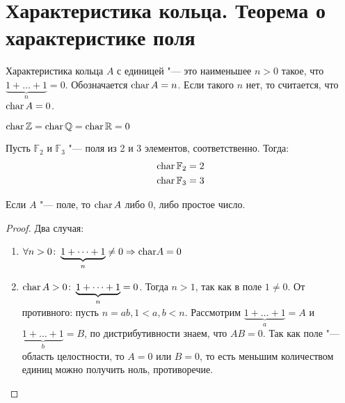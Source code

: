 \section{Характеристика кольца. Теорема о характеристике поля}
\begin{Def}
	Характеристика кольца $A$ с единицей "--- это наименьшее $n > 0$ такое, что $\underbrace{1+\dots+1}_{n} = 0$.
	Обозначается $\operatorname{char} A = n$.
	Если такого $n$ нет, то считается, что $\operatorname{char} A = 0$.
\end{Def}

\begin{exmp}
	$\operatorname{char} \mathbb{Z} = \operatorname{char} \mathbb{Q} = \operatorname{char} \mathbb{R} = 0$
\end{exmp}
\begin{exmp}
	Пусть $\mathbb{F}_2$ и $\mathbb{F}_3$ "--- поля из 2 и 3 элементов, соответственно. Тогда:
	\begin{gather*}
	\operatorname{char} \mathbb{F}_2 = 2 \\
	\operatorname{char} \mathbb{F}_3 = 3
	\end{gather*}
\end{exmp}

\begin{theorem} 
	Если $A$ "--- поле, то $\operatorname{char} A$ либо $0$, либо простое число.
\end{theorem}
\begin{proof}
	Два случая:
	\begin{enumerate}
	\item $\forall n > 0 \colon \underbrace{1 + \dots + 1}_{n} \neq 0 \Rightarrow \mathrm{char} A = 0$
	\item $\operatorname{char} A > 0 \colon \underbrace{1 + \dots + 1}_{n} = 0$. Тогда $n > 1$, так как в поле $1 \neq 0$.
	От противного: пусть $n = ab, 1 < a, b < n$.
	Рассмотрим $\underbrace{1+\dots+1}_a = A$ и $\underbrace{1+\dots+1}_b = B$, по дистрибутивности
	знаем, что $AB=0$. Так как поле "--- область целостности, то $A=0$ или $B=0$, то
	есть меньшим количеством единиц можно получить ноль, противоречие.
	\end{enumerate}
\end{proof}
